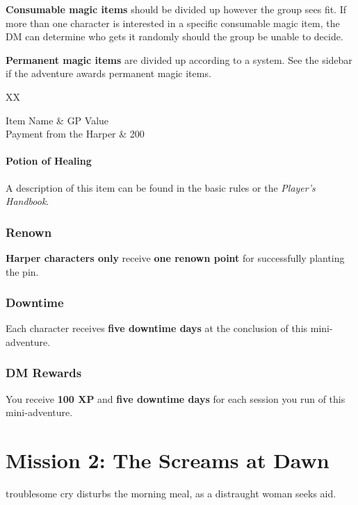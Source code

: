 \documentclass[10pt,a4paper,twoside,bg=print,twocolumn,openany,nodeprecatedcode]{dndbook}
\begin{document}
\textbf{Consumable magic items} should be divided up however the group sees fit. If more than one character is interested in a specific consumable magic item, the DM can determine who gets it randomly should the group be unable to decide.

\textbf{Permanent magic items} are divided up according to a system. See the sidebar if the adventure awards permanent magic items.

\begin{DndTable}[header=Treasure Awards]{XX}

Item Name & GP Value\\
Payment from the Harper & 200\\
\end{DndTable}

\subsubsection{Potion of Healing}
A description of this item can be found in the basic rules or the \textit{Player's Handbook}.

\subsection{Renown}
\textbf{Harper characters only} receive \textbf{one renown point} for successfully planting the pin.

\subsection{Downtime}
Each character receives \textbf{five downtime days} at the conclusion of this mini-adventure.

\subsection{DM Rewards}
You receive \textbf{100 XP} and \textbf{five downtime days} for each session you run of this mini-adventure.

\chapter{Mission 2: The Screams at Dawn}
 troublesome cry disturbs the morning meal, as a distraught woman seeks aid.
\end{document}
